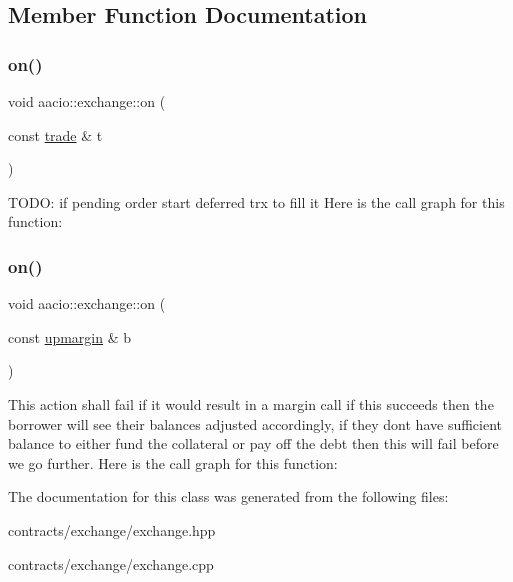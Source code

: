 \subsection{Member Function Documentation}
\mbox{\label{classaacio_1_1exchange_a43b2bdac8c60fed94c556f2e06bdfda2}} 
\subsubsection{\texorpdfstring{on()}{on()}\hspace{0.1cm}{\footnotesize\ttfamily [1/2]}}
{\footnotesize\ttfamily void aacio\+::exchange\+::on (\begin{DoxyParamCaption}\item[{const \mbox{\hyperlink{structaacio_1_1exchange_1_1trade}{trade}} \&}]{t }\end{DoxyParamCaption})}

T\+O\+DO\+: if pending order start deferred trx to fill it Here is the call graph for this function\+:
\mbox{\label{classaacio_1_1exchange_a27ed06b661427aca5e67cd9d514e6635}} 
\subsubsection{\texorpdfstring{on()}{on()}\hspace{0.1cm}{\footnotesize\ttfamily [2/2]}}
{\footnotesize\ttfamily void aacio\+::exchange\+::on (\begin{DoxyParamCaption}\item[{const \mbox{\hyperlink{structaacio_1_1exchange_1_1upmargin}{upmargin}} \&}]{b }\end{DoxyParamCaption})}

This action shall fail if it would result in a margin call if this succeeds then the borrower will see their balances adjusted accordingly, if they don\textquotesingle{}t have sufficient balance to either fund the collateral or pay off the debt then this will fail before we go further. Here is the call graph for this function\+:


The documentation for this class was generated from the following files\+:\begin{DoxyCompactItemize}
\item 
contracts/exchange/exchange.\+hpp\item 
contracts/exchange/exchange.\+cpp\end{DoxyCompactItemize}
